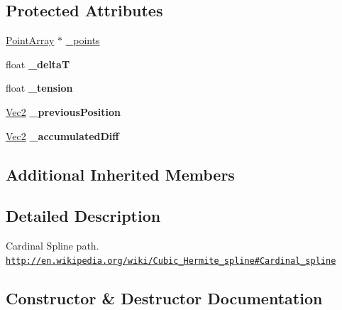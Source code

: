 \subsection*{Protected Attributes}
\begin{DoxyCompactItemize}
\item 
\hyperlink{classPointArray}{Point\+Array} $\ast$ \hyperlink{classCardinalSplineTo_a3ef76fd17e6ad9641c4f6aa27b5d6ec9}{\+\_\+points}
\item 
\mbox{\label{classCardinalSplineTo_aacfa7f1704ca793acd4a5555498dada7}} 
float {\bfseries \+\_\+deltaT}
\item 
\mbox{\label{classCardinalSplineTo_abad24f24a0bcc8af9bea186979179979}} 
float {\bfseries \+\_\+tension}
\item 
\mbox{\label{classCardinalSplineTo_a1bc10750bd03d6f4393320c5fd72152c}} 
\hyperlink{classVec2}{Vec2} {\bfseries \+\_\+previous\+Position}
\item 
\mbox{\label{classCardinalSplineTo_aec59ab2d2bb76360da0b734852026db3}} 
\hyperlink{classVec2}{Vec2} {\bfseries \+\_\+accumulated\+Diff}
\end{DoxyCompactItemize}
\subsection*{Additional Inherited Members}


\subsection{Detailed Description}
Cardinal Spline path. \href{http://en.wikipedia.org/wiki/Cubic_Hermite_spline#Cardinal_spline}{\tt http\+://en.\+wikipedia.\+org/wiki/\+Cubic\+\_\+\+Hermite\+\_\+spline\#\+Cardinal\+\_\+spline} 

\subsection{Constructor \& Destructor Documentation}
\mbox{\label{classCardinalSplineTo_a010ec0625178c6c109cf59a8b56cc18a}} 
